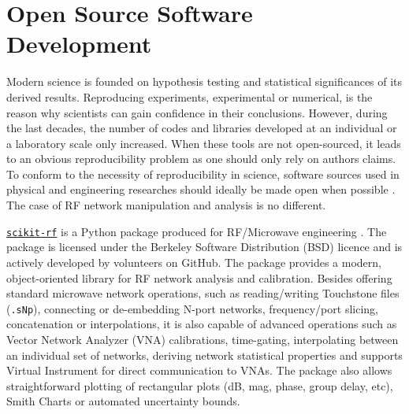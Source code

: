 
\clearpage
\section[Open Source Software]{Open Source Software Development}

Modern science is founded on hypothesis testing and statistical significances of its derived results. Reproducing experiments, experimental or numerical, is the reason why scientists can gain confidence in their conclusions. However, during the last decades, the number of codes and libraries developed at an individual or a laboratory scale only increased. When these tools are not open-sourced, it leads to an obvious reproducibility problem as one should only rely on authors claims. To conform to the necessity of reproducibility in science,  software sources used in physical and engineering researches should ideally be made open when possible . The case of RF network manipulation and analysis is no different.  

\href{http://www.scikit-rf.org}{\texttt{scikit-rf}} is a Python package produced for RF/Microwave engineering  . The package is licensed under the Berkeley Software Distribution (BSD) licence and is actively developed by volunteers on GitHub. The package provides a modern, object-oriented library for RF network analysis and calibration. Besides offering standard microwave network operations, such as reading/writing Touchstone files (\texttt{.sNp}), connecting or de-embedding N-port networks, frequency/port slicing, concatenation or interpolations, it is also capable of advanced operations such as Vector Network Analyzer (VNA) calibrations, time-gating, interpolating between an individual set of networks, deriving network statistical properties and supports Virtual Instrument for direct communication to VNAs. The package also allows straightforward plotting of rectangular plots (dB, mag, phase, group delay, etc), Smith Charts or automated uncertainty bounds. 

